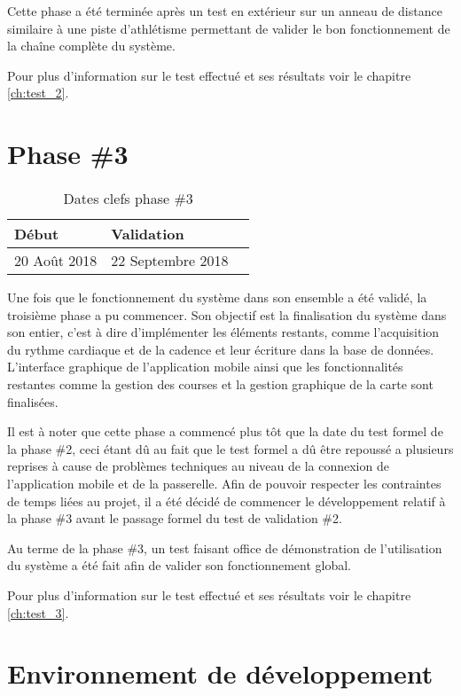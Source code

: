 Cette phase a été terminée après un test en extérieur sur un anneau de distance similaire à une piste d'athlétisme permettant de valider le bon fonctionnement de la chaîne complète du système.

Pour plus d'information sur le test effectué et ses résultats voir le chapitre \ref{ch:test_2}.

\section{Phase \#3}

\begin{table}[htb]
\caption{Dates clefs phase \#3}
\label{tab:detail_phase_3}
\centering
\begin{tabular}{ l l l }
\toprule
Début & Validation \\
\midrule
20 Août 2018 & 22 Septembre 2018  \\
\bottomrule 
\end{tabular}
\end{table}

Une fois que le fonctionnement du système dans son ensemble a été validé, la troisième phase a pu commencer. Son objectif est la finalisation du système dans son entier, c'est à dire d'implémenter les éléments restants, comme l'acquisition du rythme cardiaque et de la cadence et leur écriture dans la base de données. L'interface graphique de l'application mobile ainsi que les fonctionnalités restantes comme la gestion des courses et la gestion graphique de la carte sont finalisées.

Il est à noter que cette phase a commencé plus tôt que la date du test formel de la phase \#2, ceci étant dû au fait que le test formel a dû être repoussé a plusieurs reprises à cause de problèmes techniques au niveau de la connexion de l'application mobile et de la passerelle. Afin de pouvoir respecter les contraintes de temps liées au projet, il a été décidé de commencer le développement relatif à la phase \#3 avant le passage formel du test de validation \#2.

Au terme de la phase \#3, un test faisant office de démonstration de l'utilisation du système a été fait afin de valider son fonctionnement global.

Pour plus d'information sur le test effectué et ses résultats voir le chapitre \ref{ch:test_3}.

\section{Environnement de développement}

